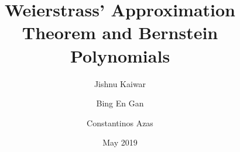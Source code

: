 \documentclass{beamer}
\title{Weierstrass' Approximation Theorem and Bernstein Polynomials}
\author{Jishnu Kaiwar
  \and
  Bing En Gan
  \and
  Constantinos Azas}
\date{May 2019}
\begin{document}
\frame{\titlepage}
\end{document}
